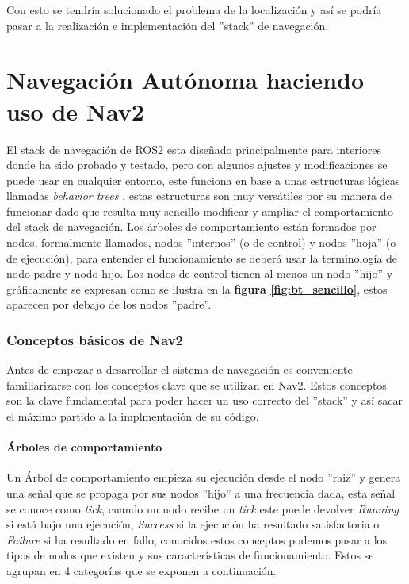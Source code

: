 Con esto se tendría solucionado el problema de la localización y así se podría pasar a la realización e implementación del ''stack'' 
de navegación.

\chapter{Navegación Autónoma haciendo uso de Nav2}

El stack de navegación de ROS2 esta diseñado principalmente para interiores donde ha sido probado y testado, pero con algunos ajustes y modificaciones se puede usar en cualquier entorno, este funciona en base a unas estructuras 
lógicas llamadas \textit{behavior trees} \cite{colledanchise2018behavior}, estas estructuras son muy versátiles por su manera de funcionar dado que resulta muy 
sencillo modificar y ampliar el comportamiento del stack de navegación. Los árboles de comportamiento están formados por nodos, formalmente llamados, 
nodos ''internos'' (o de control) y nodos ''hoja'' (o de ejecución), para entender el funcionamiento se deberá usar la terminología de nodo padre y nodo hijo. 
Los nodos de control tienen al menos un nodo ''hijo'' y gráficamente se expresan como se ilustra en la \textbf{figura \ref{fig:bt_sencillo}}, estos aparecen por debajo de 
los nodos ''padre''.

\subsection{Conceptos básicos de Nav2}
Antes de empezar a desarrollar el sistema de navegación es conveniente familiarizarse con los conceptos clave que se utilizan en Nav2. Estos conceptos 
son la clave fundamental para poder hacer un uso correcto del ''stack'' y así sacar el máximo partido a la implmentación de su código.

\subsubsection{Árboles de comportamiento}
Un Árbol de comportamiento empieza su ejecución desde el nodo ''raiz'' y genera una señal que se propaga por sus nodos ''hijo'' a una frecuencia dada, 
esta señal se conoce como \textit{tick}, cuando un nodo recibe un \textit{tick} este puede devolver \textit{Running} si está bajo una ejecución, 
\textit{Success} si la ejecución ha resultado satisfactoria o \textit{Failure} si ha resultado en fallo, conocidos estos conceptos podemos pasar 
a los tipos de nodos que existen y sus características de funcionamiento. Estos se agrupan en 4 categorías que se exponen a continuación.


